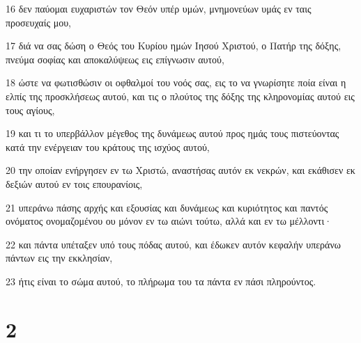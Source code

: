 \par 16 δεν παύομαι ευχαριστών τον Θεόν υπέρ υμών, μνημονεύων υμάς εν ταις προσευχαίς μου,
\par 17 διά να σας δώση ο Θεός του Κυρίου ημών Ιησού Χριστού, ο Πατήρ της δόξης, πνεύμα σοφίας και αποκαλύψεως εις επίγνωσιν αυτού,
\par 18 ώστε να φωτισθώσιν οι οφθαλμοί του νοός σας, εις το να γνωρίσητε ποία είναι η ελπίς της προσκλήσεως αυτού, και τις ο πλούτος της δόξης της κληρονομίας αυτού εις τους αγίους,
\par 19 και τι το υπερβάλλον μέγεθος της δυνάμεως αυτού προς ημάς τους πιστεύοντας κατά την ενέργειαν του κράτους της ισχύος αυτού,
\par 20 την οποίαν ενήργησεν εν τω Χριστώ, αναστήσας αυτόν εκ νεκρών, και εκάθισεν εκ δεξιών αυτού εν τοις επουρανίοις,
\par 21 υπεράνω πάσης αρχής και εξουσίας και δυνάμεως και κυριότητος και παντός ονόματος ονομαζομένου ου μόνον εν τω αιώνι τούτω, αλλά και εν τω μέλλοντι·
\par 22 και πάντα υπέταξεν υπό τους πόδας αυτού, και έδωκεν αυτόν κεφαλήν υπεράνω πάντων εις την εκκλησίαν,
\par 23 ήτις είναι το σώμα αυτού, το πλήρωμα του τα πάντα εν πάσι πληρούντος.

\chapter{2}

